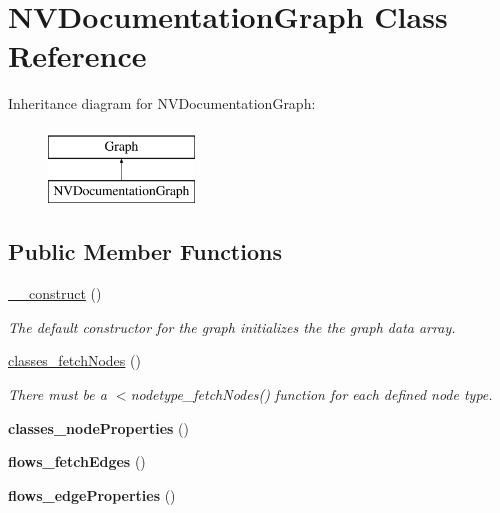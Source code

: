 \hypertarget{classNVDocumentationGraph}{
\section{NVDocumentationGraph Class Reference}
\label{classNVDocumentationGraph}
}
Inheritance diagram for NVDocumentationGraph:\begin{figure}[H]
\begin{center}
\leavevmode
\includegraphics[height=2.000000cm]{classNVDocumentationGraph}
\end{center}
\end{figure}
\subsection*{Public Member Functions}
\begin{DoxyCompactItemize}
\item 
\hyperlink{classNVDocumentationGraph_ae3c6418b6e1fd018895ddc79101a0059}{\_\-\_\-construct} ()
\begin{DoxyCompactList}\small\item\em The default constructor for the graph initializes the the graph data array. \item\end{DoxyCompactList}\item 
\hyperlink{classNVDocumentationGraph_a236064565deaa3e43405ed8c500e0f76}{classes\_\-fetchNodes} ()
\begin{DoxyCompactList}\small\item\em There must be a $<$nodetype\_\-fetchNodes() function for each defined node type. \item\end{DoxyCompactList}\item 
\hypertarget{classNVDocumentationGraph_a5b2d84248df33e8f62187bd2f4058b5e}{
{\bfseries classes\_\-nodeProperties} ()}
\label{classNVDocumentationGraph_a5b2d84248df33e8f62187bd2f4058b5e}

\item 
\hypertarget{classNVDocumentationGraph_adc4e90a6c8762e3ecea12ac89c7aa506}{
{\bfseries flows\_\-fetchEdges} ()}
\label{classNVDocumentationGraph_adc4e90a6c8762e3ecea12ac89c7aa506}

\item 
\hypertarget{classNVDocumentationGraph_a647d977b5a4d1ae9db82468121e1075f}{
{\bfseries flows\_\-edgeProperties} ()}
\label{classNVDocumentationGraph_a647d977b5a4d1ae9db82468121e1075f}

\end{DoxyCompactItemize}


